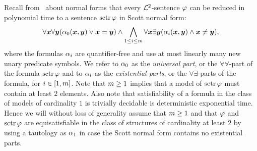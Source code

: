 Recall from~ about normal forms that every $\mathcal{L}^{2}$-sentence
$\varphi$ can be reduced in polynomial time to a sentence $\operatorname{sctr}\varphi$ in Scott
normal form:
\[
  \forall\bm{x}\forall\bm{y} (\alpha_{0}(\bm{x},\bm{y}) \lor \bm{x} = \bm{y}) \land
  \bigwedge_{1 \leq i \leq m} \forall\bm{x}\exists\bm{y}(
  \alpha_{i}(\bm{x},\bm{y}) \land \bm{x} \neq \bm{y}),
\]
where the formulas $\alpha_{i}$ are quantifier-free and use at most linearly many
new unary predicate symbols. We refer to $\alpha_{0}$ as the \emph{universal part},
or the $\forall\forall$-part of the formula $\operatorname{sctr}\varphi$ and to $\alpha_{i}$ as
the \emph{existential parts}, or the $\forall\exists$-parts of the formula,
for $i \in [1,m]$.
Note that $m \geq 1$ implies that a model of $\operatorname{sctr}\varphi$ must contain at
least $2$ elements. Also note that satisfiability of a formula in the class of
models of cardinality $1$ is trivially decidable is deterministic exponential
time.
Hence we will without loss of generality assume that $m \geq 1$ and that
$\varphi$ and $\operatorname{sctr}\varphi$ are equisatisfiable in the class of structures of
cardinality at least $2$ by using a tautology as $\alpha_{1}$ in case the Scott
normal form contains no existential parts.

